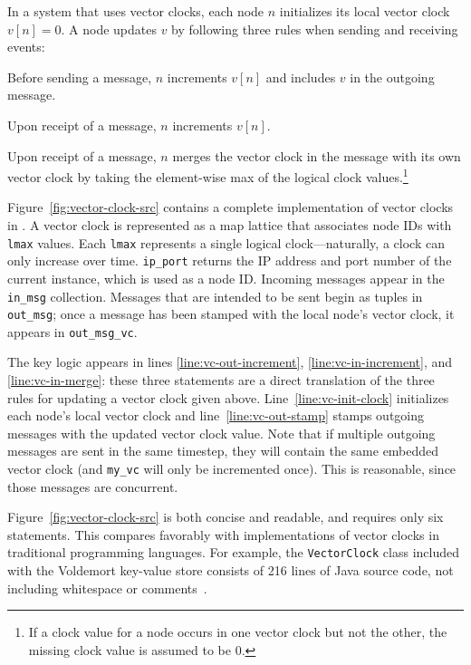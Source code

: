 In a system that uses vector clocks, each node $n$ initializes its local vector
clock $v[n] = 0$. A node updates $v$ by following three rules when sending and
receiving events:
\begin{compactenum}
\item
  Before sending a message, $n$ increments $v[n]$ and includes $v$ in the
  outgoing message.
\item
  Upon receipt of a message, $n$ increments $v[n]$.
\item
  Upon receipt of a message, $n$ merges the vector clock in the message with its
  own vector clock by taking the element-wise max of the logical clock
  values.\footnote{If a clock value for a node occurs in one vector clock but
    not the other, the missing clock value is assumed to be $0$.}
\end{compactenum}
Figure~\ref{fig:vector-clock-src} contains a complete implementation of vector
clocks in \lang. A vector clock is represented as a map lattice that associates
node IDs with \texttt{lmax} values. Each \texttt{lmax} represents a single
logical clock---naturally, a clock can only increase over time.
\texttt{ip\_port} returns the IP address and port number of the current \lang
instance, which is used as a node ID. Incoming messages appear in the
\texttt{in\_msg} collection. Messages that are intended to be sent begin as
tuples in \texttt{out\_msg}; once a message has been stamped with the local
node's vector clock, it appears in \texttt{out\_msg\_vc}.

The key logic appears in lines \ref{line:vc-out-increment},
\ref{line:vc-in-increment}, and \ref{line:vc-in-merge}: these three statements
are a direct translation of the three rules for updating a vector clock given
above. Line~\ref{line:vc-init-clock} initializes each node's local vector clock
and line~\ref{line:vc-out-stamp} stamps outgoing messages with the updated
vector clock value.  Note that if multiple outgoing messages are sent in the
same \lang timestep, they will contain the same embedded vector clock (and
\texttt{my\_vc} will only be incremented once). This is reasonable, since those
messages are concurrent.

Figure~\ref{fig:vector-clock-src} is both concise and readable, and requires
only six \lang statements. This compares favorably with implementations of
vector clocks in traditional programming languages. For example, the
\texttt{VectorClock} class included with the Voldemort key-value store consists
of 216 lines of Java source code, not including whitespace or
comments~\cite{voldemort-vector-clock}.

